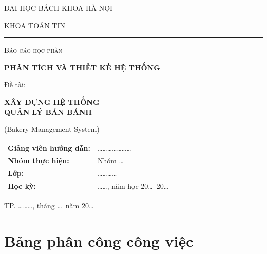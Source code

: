 \documentclass[12pt,a4paper]{report}
\begin{document}
\begin{titlepage}
\centering
{\large ĐẠI HỌC BÁCH KHOA HÀ NỘI\par}
{\large KHOA TOÁN TIN\par}
\vspace{0.4cm}
\rule{\textwidth}{0.5pt}

\vfill
{\scshape\large Báo cáo học phần\par}
\vspace{0.5cm}
{\Huge\bfseries\color{primary} PHÂN TÍCH VÀ THIẾT KẾ HỆ THỐNG\par}
\vspace{1.2cm}
{\large Đề tài:\par}
\vspace{0.3cm}
{\LARGE\bfseries XÂY DỰNG HỆ THỐNG\\[0.3cm] QUẢN LÝ BÁN BÁNH\par}
\vspace{0.4cm}
{\large (Bakery Management System)\par}
\vfill

\begin{flushleft}
\hspace{2cm}\begin{tabular}{ll}
\textbf{Giảng viên hướng dẫn:} & \ldots\ldots\ldots\ldots\ldots\ldots\ldots \\[4pt]
\textbf{Nhóm thực hiện:}       & Nhóm \ldots \\[4pt]
\textbf{Lớp:}                  & \ldots\ldots\ldots\ldots \\[4pt]
\textbf{Học kỳ:}               & \ldots\ldots, năm học 20\ldots--20\ldots \\
\end{tabular}
\end{flushleft}

\vfill
{\large TP. \ldots\ldots\ldots, tháng \ldots\ năm 20\ldots\par}
\end{titlepage}

\chapter*{Bảng phân công công việc}
\end{document}
